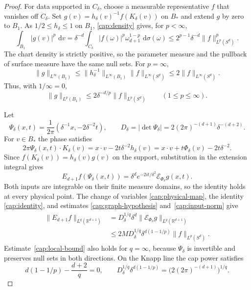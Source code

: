 \documentclass[11pt]{article}
\numberwithin{equation}{section}
\newcommand{\R}{\mathbb{R}}
\newcommand{\dd}{\,\mathrm{d}}
\newcommand{\norm}[1]{\lVert #1\rVert}
\newcommand{\abs}[1]{\lvert #1\rvert}
\begin{document}
\begin{proof}
For data supported in $C_\delta$, choose a measurable representative $f$
that vanishes off $C_\delta$. Set
$g(v)=h_\delta(v)^{-1}f(K_\delta(v))$ on $B_*$ and extend $g$ by zero
to $B_1$. As $1/2\le h_\delta\le1$ on $B_1$, \eqref{cap:density}
gives, for $p<\infty$,
\[
 \int_{B_1}\abs{g(v)}^p\,\dd v
   =\delta^{-d}\int_{C_\delta}
     \abs{f(\omega)}^p\omega_{d+1}^{1-p}\,\dd\sigma(\omega)
   \le 2^{p-1}\delta^{-d}\norm{f}_{L^p(S^d)}^p .
\]
The chart density is strictly positive, so the parameter measure and
the pullback of surface measure have the same null sets. For
\(p=\infty\),
\[
 \norm g_{L^\infty(B_1)}
 \le\norm{h_\delta^{-1}}_{L^\infty(B_1)}
       \norm f_{L^\infty(S^d)}
 \le2\norm f_{L^\infty(S^d)}.
\]
Thus, with \(1/\infty=0\),
\begin{equation}\label{cap:input-norm}
 \norm g_{L^p(B_1)}
 \le2\delta^{-d/p}\norm f_{L^p(S^d)}
 \qquad (1\le p\le\infty).
\end{equation}

Let
\begin{equation}\label{cap:physical-map}
 \Psi_\delta(x,t)=\frac1{2\pi}(\delta^{-1}x,-2\delta^{-2}t),\qquad
 D_\delta=\abs{\det\Psi_\delta}
   =2(2\pi)^{-(d+1)}\delta^{-(d+2)}.
\end{equation}
For $v\in B_*$ the phase satisfies
\[
 2\pi\Psi_\delta(x,t)\cdot K_\delta(v)
   = x\cdot v-2t\delta^{-2}h_\delta(v)
   = x\cdot v+t\Phi_\delta(v)-2t\delta^{-2}.
\]
Since $f(K_\delta(v))=h_\delta(v)g(v)$ on the support, substitution in
the extension integral gives
\begin{equation}\label{cap:identity}
 E_{d+1}f(\Psi_\delta(x,t))
   =\delta^d e^{-2it/\delta^2}\mathcal E_{\Phi_\delta}g(x,t).
\end{equation}
Both inputs are integrable on their finite measure domains, so the
identity holds at every physical point.
The change of variables \eqref{cap:physical-map}, the identity
\eqref{cap:identity}, and estimates \eqref{cap:graph-hypothesis}
and~\eqref{cap:input-norm} give
\begin{equation}\label{cap:local-bound}
 \begin{aligned}
 \norm{E_{d+1}f}_{L^q(\R^{d+1})}
 &=D_\delta^{1/q}\delta^d
       \norm{\mathcal E_{\Phi_\delta}g}_{L^q(\R^{d+1})}\\
 &\le2M D_\delta^{1/q}\delta^{d(1-1/p)}
       \norm f_{L^p(S^d)}.
 \end{aligned}
\end{equation}
Estimate~\eqref{cap:local-bound} also holds for \(q=\infty\), because \(\Psi_\delta\) is invertible
and preserves null sets in both directions. On the Knapp line the cap power satisfies
\begin{equation}\label{cap:boundary-cancellation}
 d(1-1/p)-\frac{d+2}{q}=0,\qquad
 D_\delta^{1/q}\delta^{d(1-1/p)}
 =\bigl(2(2\pi)^{-(d+1)}\bigr)^{1/q}.
\end{equation}


\end{proof}
\end{document}
